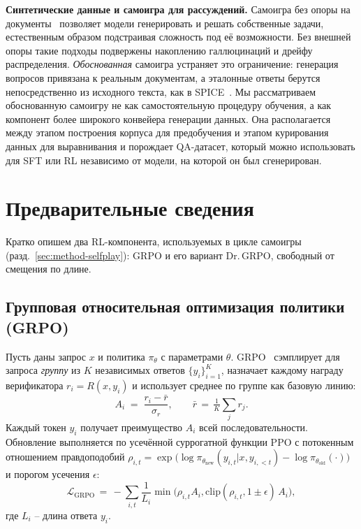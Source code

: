 \documentclass{article}
\begin{document}
\textbf{Синтетические данные и самоигра для рассуждений.}
Самоигра без опоры на документы~\cite{huang2025rzero,zhao2025absolute} позволяет модели генерировать и решать собственные задачи, естественным образом подстраивая сложность под её возможности. Без внешней опоры такие подходы подвержены накоплению галлюцинаций и дрейфу распределения. \emph{Обоснованная} самоигра устраняет это ограничение: генерация вопросов привязана к реальным документам, а эталонные ответы берутся непосредственно из исходного текста, как в SPICE~\cite{spice}. Мы рассматриваем обоснованную самоигру не как самостоятельную процедуру обучения, а как компонент более широкого конвейера генерации данных. Она располагается между этапом построения корпуса для предобучения и этапом курирования данных для выравнивания и порождает QA-датасет, который можно использовать для SFT или RL независимо от модели, на которой он был сгенерирован.

\section{Предварительные сведения}\label{sec:prelim}

Кратко опишем два RL-компонента, используемых в цикле самоигры (разд.~\ref{sec:method-selfplay}): GRPO и его вариант Dr.\,GRPO, свободный от смещения по длине.

\subsection{Групповая относительная оптимизация политики (GRPO)}

Пусть даны запрос $x$ и политика $\pi_\theta$ с параметрами $\theta$. GRPO~\cite{shao2024deepseekmath} сэмплирует для запроса \emph{группу} из $K$ независимых ответов $\{y_i\}_{i=1}^{K}$, назначает каждому награду верификатора $r_i = R(x, y_i)$ и использует среднее по группе как базовую линию:
\begin{equation}
  A_i \;=\; \frac{r_i - \bar r}{\sigma_r},
  \qquad \bar r \,=\, \tfrac{1}{K}\!\sum_j r_j .
\end{equation}
Каждый токен $y_i$ получает преимущество $A_i$ всей последовательности. Обновление выполняется по усечённой суррогатной функции PPO с потокенным отношением правдоподобий $\rho_{i,t} = \exp\!\bigl(\log\pi_{\theta_{\text{new}}}(y_{i,t}|x,y_{i,<t}) - \log\pi_{\theta_{\text{old}}}(\cdot)\bigr)$ и порогом усечения $\epsilon$:
\begin{equation}
  \mathcal{L}_{\text{GRPO}} \,=\, -\sum_{i,t}
    \frac{1}{L_i}\min\!\bigl(\rho_{i,t} A_i,
      \mathrm{clip}(\rho_{i,t}, 1\!\pm\!\epsilon)\,A_i\bigr),
  \label{eq:GRPO}
\end{equation}
где $L_i$ -- длина ответа $y_i$.
\end{document}
